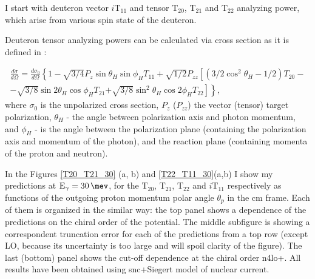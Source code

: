     I start with deuteron vector $i\text{T}_{11}$ and tensor $\text{T}_{20}$, $\text{T}_{21}$ and $\text{T}_{22}$
    analyzing power, which arise from various spin state of the deuteron.
    
    Deuteron tensor analyzing powers can be calculated via cross section as it is defined in \cite{rachek2007}:
    
    \begin{eqnarray}
            \frac{d \sigma}{d \Omega}= \frac{d \sigma_0}{d \Omega}\left\{1-\sqrt{3 / 4} P_z \sin \theta_H \sin \phi_H T_{11}\right.
            +\sqrt{1 / 2} P_{z z}\left[\left(3 / 2 \cos ^2 \theta_H-1 / 2\right) T_{20}\right. - \nonumber \\
            -\sqrt{3 / 8} \sin 2 \theta_H \cos \phi_H T_{21} 
            \left.\left.+\sqrt{3 / 8} \sin ^2 \theta_H \cos 2 \phi_H T_{22}\right]\right\},
    \end{eqnarray}
    where $\sigma_0$ is the unpolarized cross section, $P_z$ ($P_{zz}$)
    the vector (tensor) target polarization, $\theta_H$ - the angle
    between polarization axis and photon momentum,
    and $\phi_H$ - is the angle between the polarization plane 
    (containing the polarization axis and momentum of the photon),
    and the reaction plane (containing momenta of the proton
    and neutron).

    In the Figures \ref{T20_T21_30} (a, b) and \ref{T22_T11_30}(a,b)
    I show my predictions at $\text{E}_\gamma = \SI{30}{\mev}$, for the
    $\text{T}_{20}$, $\text{T}_{21}$, $\text{T}_{22}$  and $i\text{T}_{11}$ respectively as functions 
    of the outgoing proton momentum polar angle $\theta_p$ in the \gls{cm} frame. Each of them
    is organized in the similar way: the top
    panel shows a dependence of the predictions on the 
    chiral order of the potential. The middle subfigure is
    showing a correspondent truncation error for each of the 
    predictions from a top row (except LO, because its uncertainty is
    too large and will spoil clarity of the figure). The last (bottom)
    panel shows the cut-off dependence at the chiral
    order \gls{n4lo+}. 
    All results have been obtained using \gls{snc}+Siegert model of nuclear current.

